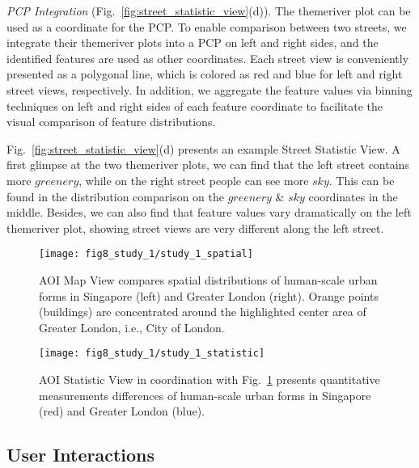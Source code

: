 \vspace*{1mm}
\noindent
\textit{PCP Integration} (Fig.~\ref{fig:street_statistic_view}(d)).
The themeriver plot can be used as a coordinate for the PCP.
To enable comparison between two streets, we integrate their themeriver plots into a PCP on left and right sides, and the identified features are used as other coordinates.
Each street view is conveniently presented as a polygonal line, which is colored as red and blue for left and right street views, respectively.
In addition, we aggregate the feature values via binning techniques on left and right sides of each feature coordinate to facilitate the visual comparison of feature distributions.

\vspace*{1mm}
Fig.~\ref{fig:street_statistic_view}(d) presents an example Street Statistic View. 
A first glimpse at the two themeriver plots, we can find that the left street contains more $greenery$, while on the right street people can see more $sky$.
This can be found in the distribution comparison on the $greenery$ \& $sky$ coordinates in the middle.
Besides, we can also find that feature values vary dramatically on the left themeriver plot, showing street views are very different along the left street.


\begin{figure}[t]
	\centering
	\texttt{[image: fig8\_study\_1/study\_1\_spatial]}
	\vspace{-4mm}
	\caption{
	AOI Map View compares spatial distributions of human-scale urban forms in Singapore (left) and Greater London (right).
	Orange points (buildings) are concentrated around the highlighted center area of Greater London, i.e., City of London.}
	\label{fig:study_1_spatial}
\end{figure}

\begin{figure}[t]
	\centering
	\texttt{[image: fig8\_study\_1/study\_1\_statistic]}
	\vspace{-7mm}
	\caption{AOI Statistic View in coordination with Fig.~\ref{fig:study_1_spatial} presents quantitative measurements differences of human-scale urban forms in Singapore (red) and Greater London (blue).}
	\label{fig:study_1_statistic}
	\vspace{-5mm}
\end{figure}


\subsection{User Interactions}
\label{ssec:user_interaction}

